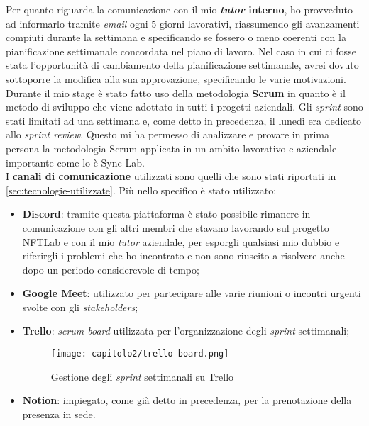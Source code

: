 Per quanto riguarda la comunicazione con il mio \textbf{\textit{tutor} interno}, ho provveduto ad informarlo tramite \textit{email} ogni 5 giorni lavorativi, riassumendo gli avanzamenti compiuti durante la settimana e specificando se fossero o meno coerenti con la pianificazione settimanale concordata nel piano di lavoro. Nel caso in cui ci fosse stata l'opportunità di cambiamento della pianificazione settimanale, avrei dovuto sottoporre la modifica alla sua approvazione, specificando le varie motivazioni. \\

Durante il mio stage è stato fatto uso della metodologia \textbf{Scrum} in quanto è il metodo di sviluppo che viene adottato in tutti i progetti aziendali. Gli \textit{sprint} sono stati limitati ad una settimana e, come detto in precedenza, il lunedì era dedicato allo \textit{sprint review}. Questo mi ha permesso di analizzare e provare in prima persona la metodologia Scrum applicata in un ambito lavorativo e aziendale importante come lo è Sync Lab. \\

I \textbf{canali di comunicazione} utilizzati sono quelli che sono stati riportati in \ref{sec:tecnologie-utilizzate}. Più nello specifico è stato utilizzato:
\begin{itemize}
  \item \textbf{Discord}: tramite questa piattaforma è stato possibile rimanere in comunicazione con gli altri membri che stavano lavorando sul progetto NFTLab e con il mio \textit{tutor} aziendale, per esporgli qualsiasi mio dubbio e riferirgli i problemi che ho incontrato e non sono riuscito a risolvere anche dopo un periodo considerevole di tempo;
  \item \textbf{Google Meet}: utilizzato per partecipare alle varie riunioni o incontri urgenti svolte con gli \textit{stakeholders};
  \item \textbf{Trello}: \textit{scrum board} utilizzata per l'organizzazione degli \textit{sprint} settimanali;
  
  \clearpage
  \begin{figure}[!h]
    \centering
    \texttt{[image: capitolo2/trello-board.png]}
    \caption{Gestione degli \textit{sprint} settimanali su Trello}
  \end{figure}

  \item \textbf{Notion}: impiegato, come già detto in precedenza, per la prenotazione della presenza in sede.
\end{itemize}

